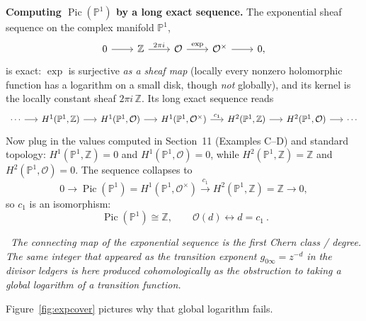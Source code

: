 \documentclass[11pt]{article}
\newcommand{\ZZ}{\mathbb Z}
\newcommand{\PP}{\mathbb P}
\newcommand{\OO}{\mathcal O}
\newcommand{\Pic}{\operatorname{Pic}}
\newcommand{\diagnose}[1]{%
  \par\smallskip\noindent{\color{accent}\textbf{Diagnosis.}}\ \emph{#1}\par\smallskip}
\theoremstyle{plain}
\theoremstyle{definition}
\begin{document}
\noindent\textbf{Computing $\Pic(\PP^1)$ by a long exact sequence.} The
exponential sheaf sequence on the complex manifold $\PP^1$,
\[
\begin{tikzcd}[column sep=2.2em]
0 \arrow[r] & \ZZ \arrow[r,"2\pi i"] & \OO \arrow[r,"\exp"] & \OO^\times \arrow[r] & 0,
\end{tikzcd}
\]
is exact: $\exp$ is surjective \emph{as a sheaf map} (locally every nonzero
holomorphic function has a logarithm on a small disk, though \emph{not}
globally), and its kernel is the locally constant sheaf $2\pi i\,\ZZ$. Its long
exact sequence reads
\[
\begin{tikzcd}[column sep=1.5em, row sep=tiny]
\cdots \arrow[r] & H^1(\PP^1,\ZZ) \arrow[r] & H^1(\PP^1,\OO) \arrow[r]
& H^1(\PP^1,\OO^\times) \arrow[r,"c_1"] & H^2(\PP^1,\ZZ) \arrow[r] & H^2(\PP^1,\OO) \arrow[r] & \cdots
\end{tikzcd}
\]
Now plug in the values computed in Section~11 (Examples C--D) and standard
topology: $H^1(\PP^1,\ZZ)=0$ and $H^1(\PP^1,\OO)=0$, while $H^2(\PP^1,\ZZ)=\ZZ$
and $H^2(\PP^1,\OO)=0$. The sequence collapses to
\[
  0\longrightarrow \Pic(\PP^1)=H^1(\PP^1,\OO^\times)\xrightarrow{\ c_1\ }H^2(\PP^1,\ZZ)=\ZZ\longrightarrow0,
\]
so $c_1$ is an isomorphism:
\[
  \boxed{\ \Pic(\PP^1)\cong\ZZ,\qquad \OO(d)\longleftrightarrow d=c_1\ }.
\]
\diagnose{The connecting map of the exponential sequence \emph{is} the first
Chern class / degree. The same integer that appeared as the transition exponent
$g_{0\infty}=z^{-d}$ in the divisor ledgers is here produced cohomologically as
the obstruction to taking a global logarithm of a transition function.}

\noindent Figure~\ref{fig:expcover} pictures why that global logarithm fails.
\end{document}
